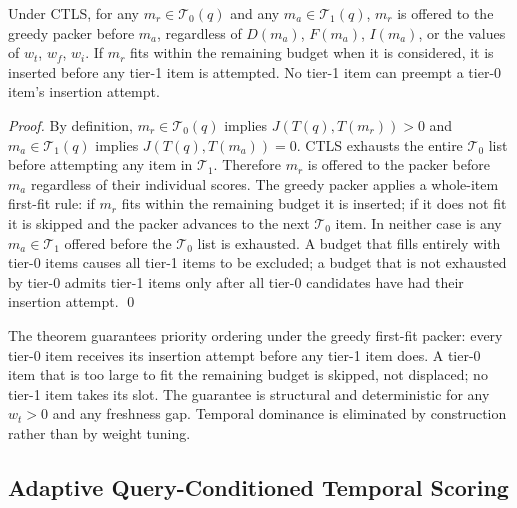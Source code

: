 \begin{theorem}
Under CTLS, for any $m_r \in \mathcal{T}_0(q)$ and any $m_a \in \mathcal{T}_1(q)$, $m_r$ is offered to the greedy packer before $m_a$, regardless of $D(m_a)$, $F(m_a)$, $I(m_a)$, or the values of $w_t$, $w_f$, $w_i$. If $m_r$ fits within the remaining budget when it is considered, it is inserted before any tier-1 item is attempted. No tier-1 item can preempt a tier-0 item's insertion attempt.
\end{theorem}

\begin{proof}
By definition, $m_r \in \mathcal{T}_0(q)$ implies $J(T(q),T(m_r)) > 0$ and $m_a \in \mathcal{T}_1(q)$ implies $J(T(q),T(m_a)) = 0$. CTLS exhausts the entire $\mathcal{T}_0$ list before attempting any item in $\mathcal{T}_1$. Therefore $m_r$ is offered to the packer before $m_a$ regardless of their individual scores. The greedy packer applies a whole-item first-fit rule: if $m_r$ fits within the remaining budget it is inserted; if it does not fit it is skipped and the packer advances to the next $\mathcal{T}_0$ item. In neither case is any $m_a \in \mathcal{T}_1$ offered before the $\mathcal{T}_0$ list is exhausted. A budget that fills entirely with tier-0 items causes all tier-1 items to be excluded; a budget that is not exhausted by tier-0 admits tier-1 items only after all tier-0 candidates have had their insertion attempt. \qed
\end{proof}

The theorem guarantees priority ordering under the greedy first-fit packer: every tier-0 item receives its insertion attempt before any tier-1 item does. A tier-0 item that is too large to fit the remaining budget is skipped, not displaced; no tier-1 item takes its slot. The guarantee is structural and deterministic for any $w_t > 0$ and any freshness gap. Temporal dominance is eliminated by construction rather than by weight tuning.

\subsection{Adaptive Query-Conditioned Temporal Scoring}
\label{sec:method_adaptive}

